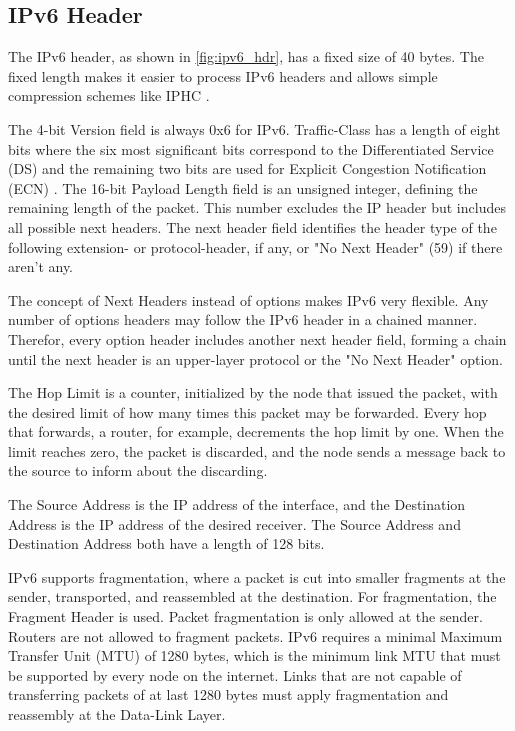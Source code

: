 \subsection{IPv6 Header}
\label{sec:ipv6_hdr}


The IPv6 header, as shown in \autoref{fig:ipv6_hdr}, has a fixed size of 40 bytes.
The fixed length makes it easier to process IPv6 headers and allows simple compression schemes like IPHC \cite{rfc6282}.

The 4-bit Version field is always 0x6 for IPv6.
Traffic-Class has a length of eight bits where the six most significant bits correspond to the Differentiated Service (DS) \cite{rfc2474} and
the remaining two bits are used for Explicit Congestion Notification (ECN) \cite{rfc3168}.
The 16-bit Payload Length field is an unsigned integer, defining the remaining length of the packet.
This number excludes the IP header but includes all possible next headers.
The next header field identifies the header type of the following extension- or protocol-header, if any, or "No Next Header" (59) if there aren't any.

The concept of Next Headers instead of options makes IPv6 very flexible.
Any number of options headers may follow the IPv6 header in a chained manner.
Therefor, every option header includes another next header field, forming a chain until the next header is an upper-layer protocol or the "No Next Header" option.

The Hop Limit is a counter, initialized by the node that issued the packet, with the desired limit of how many times this packet may be forwarded.
Every hop that forwards, a router, for example, decrements the hop limit by one.
When the limit reaches zero, the packet is discarded, and the node sends a message back to the source to inform about the discarding.

The Source Address is the IP address of the interface, and the Destination Address is the IP address of the desired receiver.
The Source Address and Destination Address both have a length of 128 bits.

IPv6 supports fragmentation, where a packet is cut into smaller fragments at the sender, transported, and reassembled at the destination.
For fragmentation, the Fragment Header is used.
Packet fragmentation is only allowed at the sender. Routers are not allowed to fragment packets.
IPv6 requires a minimal Maximum Transfer Unit (MTU) of 1280 bytes, which is the minimum link MTU that must be supported by every node on the internet.
Links that are not capable of transferring packets of at last 1280 bytes must apply fragmentation and reassembly at the Data-Link Layer.

